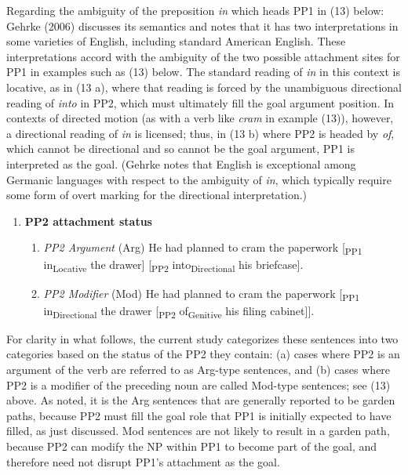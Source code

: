 \documentclass[11pt,oneside]{book}
\providecommand{\tightlist}{%
  \setlength{\itemsep}{0pt}\setlength{\parskip}{0pt}}
\begin{document}
Regarding the ambiguity of the preposition \emph{in} which heads PP1 in (13) below: Gehrke (2006) discusses its semantics and notes that it has two interpretations in some varieties of English, including standard American English. These interpretations accord with the ambiguity of the two possible attachment sites for PP1 in examples such as (13) below. The standard reading of \emph{in} in this context is locative, as in (13 a), where that reading is forced by the unambiguous directional reading of \emph{into} in PP2, which must ultimately fill the goal argument position. In contexts of directed motion (as with a verb like \emph{cram} in example (13)), however, a directional reading of \emph{in} is licensed; thus, in (13 b) where PP2 is headed by \emph{of}, which cannot be directional and so cannot be the goal argument, PP1 is interpreted as the goal. (Gehrke notes that English is exceptional among Germanic languages with respect to the ambiguity of \emph{in}, which typically require some form of overt marking for the directional interpretation.)

\begin{enumerate}
\def\labelenumi{(\arabic{enumi})}
\setcounter{enumi}{12}
\tightlist
\item
  \textbf{PP2 attachment status} \linebreak\nopagebreak

  \begin{enumerate}
  \def\labelenumii{(\alph{enumii})}
  \tightlist
  \item
    \emph{PP2 Argument} (Arg) \linebreak\nopagebreak
    He had planned to cram the paperwork {[}\textsubscript{PP1} in\textsubscript{Locative} the drawer{]} {[}\textsubscript{PP2} into\textsubscript{Directional} his briefcase{]}.
  \item
    \emph{PP2 Modifier} (Mod) \linebreak\nopagebreak
    He had planned to cram the paperwork {[}\textsubscript{PP1} in\textsubscript{Directional} the drawer {[}\textsubscript{PP2} of\textsubscript{Genitive} his filing cabinet{]}{]}.
  \end{enumerate}
\end{enumerate}

For clarity in what follows, the current study categorizes these sentences into two categories based on the status of the PP2 they contain: (a) cases where PP2 is an argument of the verb are referred to as Arg-type sentences, and (b) cases where PP2 is a modifier of the preceding noun are called Mod-type sentences; see (13) above. As noted, it is the Arg sentences that are generally reported to be garden paths, because PP2 must fill the goal role that PP1 is initially expected to have filled, as just discussed. Mod sentences are not likely to result in a garden path, because PP2 can modify the NP within PP1 to become part of the goal, and therefore need not disrupt PP1's attachment as the goal.
\end{document}
